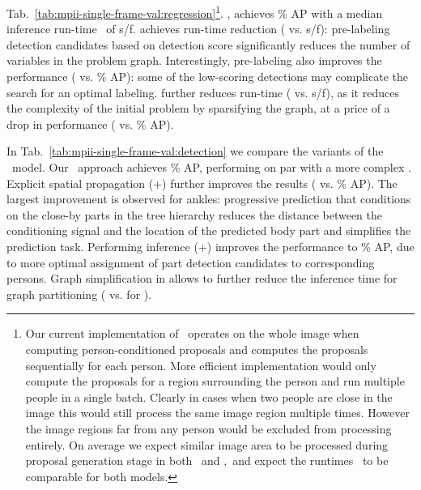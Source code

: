 Tab.~\ref{tab:mpii-single-frame-val:regression}\footnote{\label{cnntime}Our current implementation
  of \tdbushort~operates on the whole image when computing person-conditioned proposals and computes
  the proposals sequentially for each person. More efficient implementation would only compute the
  proposals for a region surrounding the person and run multiple people in a single batch. Clearly
  in cases when two people are close in the image this would still process the same image region
  multiple times. However the image regions far from any person would be excluded from processing
  entirely. On average we expect similar image area to be processed during proposal generation stage
  in both \tdbushort~and \busparse,~and expect the runtimes \timecnn~to be comparable for both
  models.}.  \bufull,  achieves \% AP with a median inference run-time
\timeinfer~of  s/f. \bufull{} achieves  run-time reduction ( vs.  s/f):
pre-labeling detection candidates based on detection score significantly reduces the number of
variables in the problem graph. Interestingly, pre-labeling also improves the performance (
vs. \% AP): some of the low-scoring detections may complicate the search for an optimal
labeling.  further reduces run-time ( vs.  s/f), as
it reduces the complexity of the initial problem by sparsifying the graph, at a price of a drop in
performance ( vs. \% AP).


In Tab.~\ref{tab:mpii-single-frame-val:detection} we compare the variants of the \tdbushort~model.
Our ~approach achieves \% AP, performing on par with a more complex . 
Explicit spatial propagation
(\tdshort{}+\spatprop ) further improves the results ( vs. \% AP). The largest
improvement is observed for ankles: progressive prediction that conditions on the close-by parts in
the tree hierarchy reduces the distance between the conditioning signal and the location of the
predicted body part and simplifies the prediction task. Performing inference
(\tdbushort{}+\spatprop) improves the performance to \% AP, due to more optimal assignment of
part detection candidates to corresponding persons. Graph simplification in \tdbushort{}
 allows to further reduce the inference time for graph partitioning ( vs.  for
).


